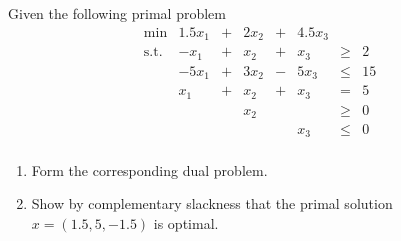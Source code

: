 \documentclass{article}
\begin{document}
\begin{exercise}[LP Duality]
    Given the following primal problem \begin{equation*}
        \begin{array}{crcrcrcr}
             \min & 1.5 x_1 & + & 2x_2 &+ & 4.5x_3\\
             \text{s.t.}&  -x_1 & + & x_2 &+ & x_3 & \geq &2\\
             &  -5x_1 & + & 3x_2 &- & 5x_3 & \leq &15\\
              &  x_1 & + & x_2 &+ & x_3 & = &5\\
              &  &  & x_2 & & & \geq &0\\
              & &  &  & & x_3 & \leq &0\\
        \end{array}
    \end{equation*}
    \begin{enumerate}
        \item Form the corresponding dual problem.
        \item Show by complementary slackness that the primal solution $x = (1.5,5, -1.5)$ is optimal.
    \end{enumerate}
\end{exercise}
\end{document}
